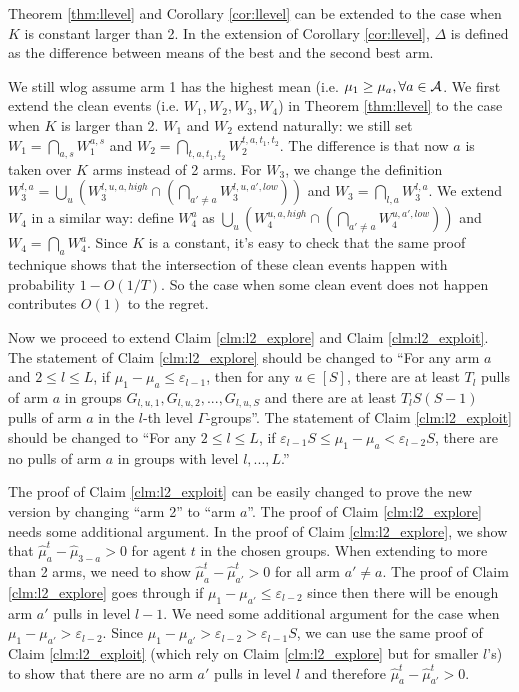 \begin{theorem}
\label{thm:constarm}
Theorem \ref{thm:llevel} and Corollary \ref{cor:llevel} can be extended to the case when $K$ is constant larger than 2. In the extension of Corollary \ref{cor:llevel}, $\Delta$ is defined as the difference between means of the best and the second best arm.
\end{theorem}

We still wlog assume arm 1 has the highest mean (i.e. $\mu_1 \geq \mu_a, \forall a \in \mathcal{A}$. We first extend the clean events (i.e. $W_1,W_2,W_3,W_4$) in Theorem \ref{thm:llevel} to the case when $K$ is larger than 2. $W_1$ and $W_2$ extend naturally: we still set $W_1 = \bigcap_{a,s}W_1^{a,s}$ and $W_2 = \bigcap_{t,a,t_1,t_2} W_2^{t,a,t_1,t_2}$. The difference is that now $a$ is taken over $K$ arms instead of 2 arms. For $W_3$, we change the definition $W_3^{l,a} = \bigcup_u \left(W_3^{l,u,a,high}  \cap \left(\bigcap_{a' \neq a} W_3^{l,u,a',low}\right) \right)$ and $W_3 = \bigcap_{l,a} W_3^{l,a}$. We extend $W_4$ in a similar way: define $W^{a}_4$ as $\bigcup_u \left(W_4^{u,a,high} \cap \left(\bigcap_{a' \neq a} W_4^{u,a',low}\right) \right)$ and $W_4 = \bigcap_a W^a_4$. Since $K$ is a constant, it's easy to check that the same proof technique shows that the intersection of these clean events happen with probability  $1-O(1/T)$. So the case when some clean event does not happen contributes $O(1)$ to the regret. 

Now we proceed to extend Claim \ref{clm:l2_explore} and Claim \ref{clm:l2_exploit}. The statement of Claim \ref{clm:l2_explore} should be changed to ``For any arm $a$ and $2\leq l \leq L$, if $\mu_1 - \mu_a \leq \varepsilon_{l-1}$, then for any $u \in [S]$, there are at least $T_l$ pulls of arm $a$ in groups $G_{l,u,1},G_{l,u,2}, ... ,G_{l,u,S}$ and there are at least $T_lS(S-1)$ pulls of arm $a$ in the $l$-th level $\Gamma$-groups''. The statement of Claim \ref{clm:l2_exploit} should be changed to ``For any $2 \leq l \leq L$, if $\varepsilon_{l-1} S\leq \mu_1 - \mu_a < \varepsilon_{l-2} S$, there are no pulls of arm $a$ in groups with level $l,...,L$.'' 

The proof of Claim \ref{clm:l2_exploit} can be easily changed to prove the new version by changing ``arm 2'' to ``arm $a$''. The proof of Claim \ref{clm:l2_explore} needs some additional argument. In the proof of Claim \ref{clm:l2_explore}, we show that $\hat{\mu}_a^t - \hat{\mu}_{3-a} > 0 $ for agent $t$ in the chosen groups. When extending to more than 2 arms, we need to show $\hat{\mu}_a^t - \hat{\mu}_{a'}^t > 0$ for all arm $a' \neq a$. The proof of Claim \ref{clm:l2_explore} goes through if $\mu_1- \mu_{a'} \leq \varepsilon_{l-2}$ since then there will be enough arm $a'$ pulls in level $l-1$. We need some additional argument for the case when $\mu_1 - \mu_{a'} > \varepsilon_{l-2}$. Since $\mu_1- \mu_{a'} > \varepsilon_{l-2} > \varepsilon_{l-1}S$, we can use the same proof of Claim \ref{clm:l2_exploit} (which rely on Claim \ref{clm:l2_explore} but for smaller $l$'s) to show that there are no arm $a'$ pulls in level $l$ and therefore $\hat{\mu}_a^t - \hat{\mu}_{a'}^t > 0$. 

